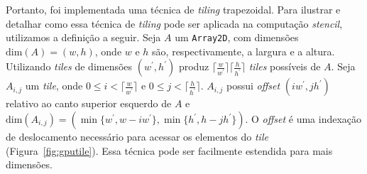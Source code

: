 \documentclass[12pt]{article}
\newcommand{\fw}{\textit{framework}\xspace}
\newcommand{\pskel}{PSkel\xspace}
\newcommand{\stencil}{\textit{stencil}\xspace}
\begin{document}

Portanto, foi implementada uma técnica de \textit{tiling} trapezoidal. Para
ilustrar e detalhar como essa técnica de \textit{tiling} pode ser aplicada na
computação \stencil, utilizamos a definição a seguir. Seja $A$ um
\texttt{Array2D}, com dimensões $\textrm{dim}(A)  =  (w,  h)$, onde $w$ e  $h$
são, respectivamente, a largura e a altura. Utilizando \textit{tiles} de
dimensões $(w^\prime, h^\prime)$ produz
$\lceil\frac{w}{w^\prime}\rceil\lceil\frac{h}{h^\prime}\rceil$ \textit{tiles}
possíveis de $A$. Seja $A_{i,j}$ um \textit{tile}, onde
$0\leq i < \lceil\frac{w}{ w^\prime}\rceil$ e
$0\leq j < \lceil\frac{h}{ h^\prime}\rceil$.
$A_{i,j}$ possui \textit{offset} $(i w^\prime,j h^\prime)$ relativo ao canto superior esquerdo de $A$ e $\textrm{dim}(A_{i,j}) = (
\min\{w^\prime, w-i w^\prime\},
\min\{h^\prime, h-j h^\prime\})$.
O \textit{offset} é uma indexação de deslocamento necessário para acessar os elementos do \textit{tile} (Figura~\ref{fig:gputile}).
Essa técnica pode ser facilmente estendida para mais dimensões.
\end{document}
